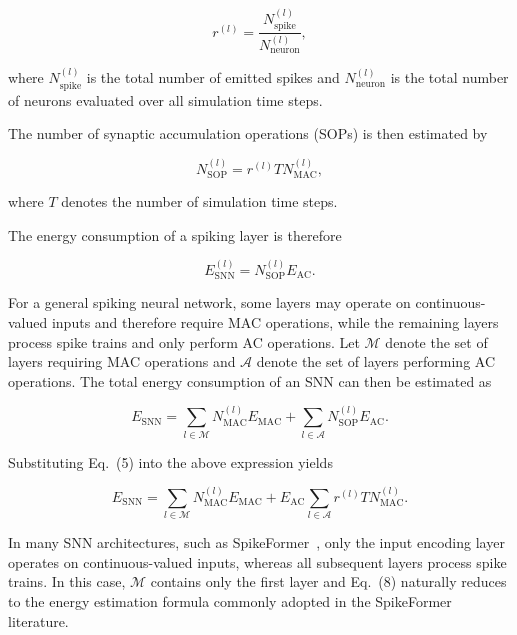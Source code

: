 \documentclass[../main.tex]{subfiles}
\begin{document}
\begin{equation}
r^{(l)}
=
\frac{N_{\mathrm{spike}}^{(l)}}
{N_{\mathrm{neuron}}^{(l)}},
\end{equation}

where $N_{\mathrm{spike}}^{(l)}$ is the total number of emitted spikes and
$N_{\mathrm{neuron}}^{(l)}$ is the total number of neurons evaluated over all
simulation time steps.

The number of synaptic accumulation operations (SOPs) is then estimated by

\begin{equation}
N_{\mathrm{SOP}}^{(l)}
=
r^{(l)}
T
N_{\mathrm{MAC}}^{(l)},
\end{equation}

where $T$ denotes the number of simulation time steps.

The energy consumption of a spiking layer is therefore

\begin{equation}
E_{\mathrm{SNN}}^{(l)}
=
N_{\mathrm{SOP}}^{(l)}
E_{\mathrm{AC}}.
\end{equation}

For a general spiking neural network, some layers may operate on continuous-valued
inputs and therefore require MAC operations, while the remaining layers process
spike trains and only perform AC operations. Let $\mathcal{M}$ denote the set of
layers requiring MAC operations and $\mathcal{A}$ denote the set of layers
performing AC operations. The total energy consumption of an SNN can then be
estimated as

\begin{equation}
E_{\mathrm{SNN}}
=
\sum_{l\in\mathcal{M}}
N_{\mathrm{MAC}}^{(l)}
E_{\mathrm{MAC}}
+
\sum_{l\in\mathcal{A}}
N_{\mathrm{SOP}}^{(l)}
E_{\mathrm{AC}}.
\end{equation}

Substituting Eq.~(5) into the above expression yields

\begin{equation}
E_{\mathrm{SNN}}
=
\sum_{l\in\mathcal{M}}
N_{\mathrm{MAC}}^{(l)}
E_{\mathrm{MAC}}
+
E_{\mathrm{AC}}
\sum_{l\in\mathcal{A}}
r^{(l)}
T
N_{\mathrm{MAC}}^{(l)}.
\end{equation}

In many SNN architectures, such as SpikeFormer~\cite{zhou2023spikeformer}, only
the input encoding layer operates on continuous-valued inputs, whereas all
subsequent layers process spike trains. In this case,
$\mathcal{M}$ contains only the first layer and Eq.~(8) naturally reduces to the
energy estimation formula commonly adopted in the SpikeFormer \cite{zhou2023spikeformer} literature.
\end{document}
